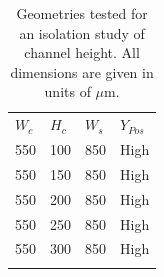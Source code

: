 \begin{table}[h]
	\caption[Geometries tested for an isolation study of channel height]{Geometries tested for an isolation study of channel height. All dimensions are given in units of $\mu$m.}
\label{tab:height}       %
\centering
\begin{tabular}{llll}
\hline\noalign{\smallskip}
$W_c$ & $H_c$ & $W_s$ & $Y_{Pos}$ \\
\noalign{\smallskip}\hline\noalign{\smallskip}
550 & 100 & 850 & High\\
550 & 150 & 850 & High\\
550 & 200 & 850 & High\\
550 & 250 & 850 & High\\
550 & 300 & 850 & High\\
\noalign{\smallskip}\hline
\end{tabular}
\end{table}

